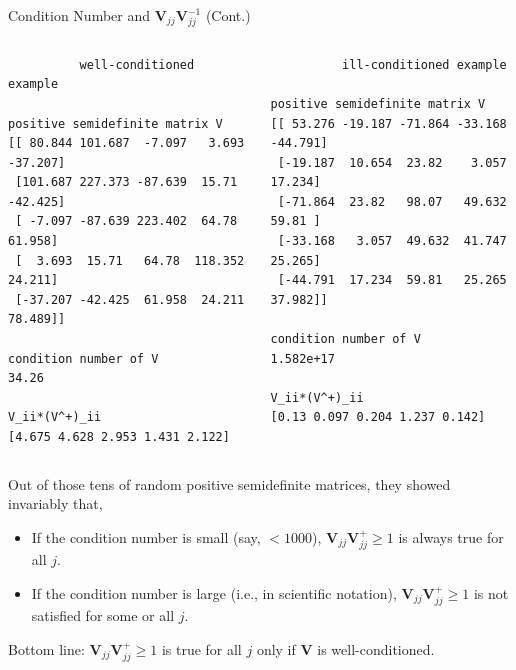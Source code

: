 \documentclass[aspectratio=169]{beamer}
\begin{document}
\begin{frame}[fragile]{Condition Number and $\mathbf{V}_{jj}\mathbf{V}^{-1}_{jj}$ (Cont.)}
  \begin{columns}
    \begin{column}{.5\textwidth}
      \tiny
      \begin{lstlisting}
          well-conditioned example

positive semidefinite matrix V
[[ 80.844 101.687  -7.097   3.693 -37.207]
 [101.687 227.373 -87.639  15.71  -42.425]
 [ -7.097 -87.639 223.402  64.78   61.958]
 [  3.693  15.71   64.78  118.352  24.211]
 [-37.207 -42.425  61.958  24.211  78.489]]

condition number of V
34.26

V_ii*(V^+)_ii
[4.675 4.628 2.953 1.431 2.122]
      \end{lstlisting}
    \end{column}
    \begin{column}{.5\textwidth}
      \tiny
      \begin{lstlisting}
          ill-conditioned example

positive semidefinite matrix V
[[ 53.276 -19.187 -71.864 -33.168 -44.791]
 [-19.187  10.654  23.82    3.057  17.234]
 [-71.864  23.82   98.07   49.632  59.81 ]
 [-33.168   3.057  49.632  41.747  25.265]
 [-44.791  17.234  59.81   25.265  37.982]]

condition number of V
1.582e+17

V_ii*(V^+)_ii
[0.13 0.097 0.204 1.237 0.142]
      \end{lstlisting}
    \end{column}
  \end{columns}
Out of those tens of random positive semidefinite matrices, they showed invariably that,
    \begin{itemize}
      \footnotesize
      \item If the condition number is small (say, $<1000$), $\mathbf{V}_{jj}\mathbf{V}^+_{jj} \ge 1$ is always true for all $j$.
      \item If the condition number is large (i.e., in scientific notation), $\mathbf{V}_{jj}\mathbf{V}^{+}_{jj} \ge 1$ is not satisfied for some or all $j$.
    \end{itemize}
Bottom line: $\mathbf{V}_{jj}\mathbf{V}^{+}_{jj} \ge 1$ is true for all $j$ only if $\mathbf{V}$ is well-conditioned.
\end{frame}
\end{document}
